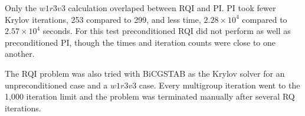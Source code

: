 \documentclass[preprint,12pt]{elsarticle}
\begin{document}



Only the $w1r3v3$ calculation overlaped between RQI and PI. PI took fewer Krylov iterations, 253 compared to 299, and less time, $2.28 \times 10^{4}$ compared to $2.57 \times 10^{4}$ seconds. For this test preconditioned RQI did not perform as well as preconditioned PI, though the times and iteration counts were close to one another. 


The RQI problem was also tried with BiCGSTAB as the Krylov solver for an unpreconditioned case and a $w1r3v3$ case. Every multigroup iteration went to the 1,000 iteration limit and the problem was terminated manually after several RQ iterations.
\end{document}
